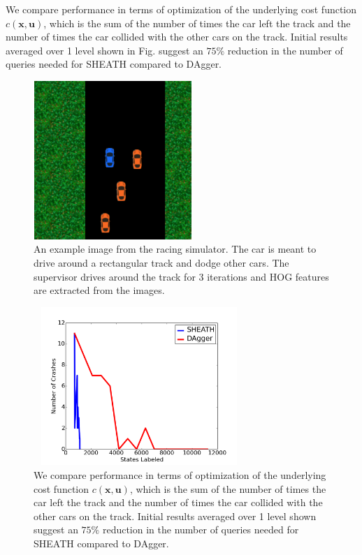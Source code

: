 \documentclass[10pt, conference]{ieeeconf}      %
\newcommand{\bu}{\mathbf{u}}
\newcommand{\bx}{\mathbf{x}}
\begin{document}
We compare performance in terms of optimization of the underlying cost function $c(\bx,\bu)$, which is the sum of the number of times the car left the track and the number of times the car collided with the other cars on the track. Initial results averaged over 1 level shown in Fig.  suggest an $75\%$ reduction in the number of queries needed for SHEATH compared to DAgger. 




\begin{figure}[t!]
\centering
\includegraphics[width=6cm, height=6cm]{figures/race_car_track_example.png}
\caption{ An example image from the racing simulator. The car is meant to drive around a rectangular track and dodge other cars. The supervisor drives around the track for 3 iterations and HOG features are extracted from the images.  }

\vspace*{-10pt}
\label{fig:race_car}
\end{figure}


\begin{figure}[t!]
\centering
\includegraphics[width=8cm, height=6cm]{figures/dagger_sheath_no_cars.png}
\caption{ We compare performance in terms of optimization of the underlying cost function $c(\bx,\bu)$, which is the sum of the number of times the car left the track and the number of times the car collided with the other cars on the track. Initial results averaged over 1 level shown suggest an $75\%$ reduction in the number of queries needed for SHEATH compared to DAgger.  }

\vspace*{-10pt}
\label{fig:car_cost}
\end{figure}
\end{document}
